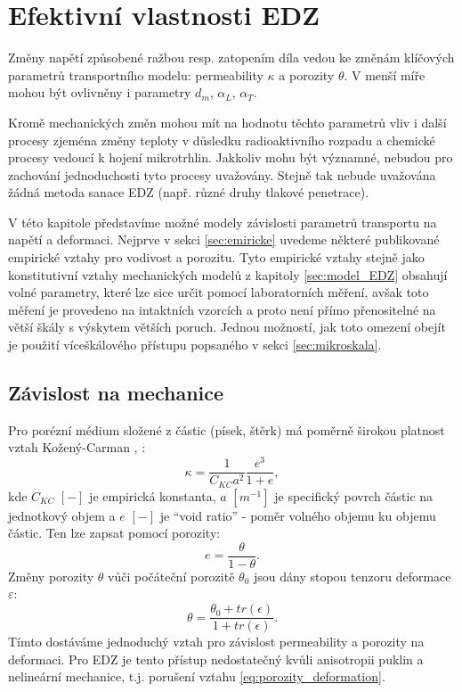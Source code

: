 \documentclass{article}
\def\eps{\varepsilon}
\begin{document}
\section{Efektivní vlastnosti EDZ}
\label{sec:micro_EDZ}
Změny napětí způsobené ražbou resp. zatopením díla vedou ke změnám klíčových parametrů transportního modelu:
permeability $\kappa$ a porozity $\theta$. V menší míře mohou být ovlivněny i parametry $d_m$, $\alpha_L$, $\alpha_T$.

Kromě mechanických změn mohou mít na hodnotu těchto parametrů vliv i další procesy zjeména změny teploty v důsledku radioaktivního rozpadu a 
chemické procesy vedoucí k hojení mikrotrhlin. Jakkoliv mohu být významné, nebudou pro zachování jednoduchosti tyto procesy uvažovány.
Stejně tak nebude uvažována žádná metoda sanace EDZ (např. různé druhy tlakové penetrace).

V této kapitole představíme možné modely závislosti parametrů transportu na napětí a deformaci.
Nejprve v sekci \ref{sec:emiricke} uvedeme některé publikované empirické vztahy pro vodivost a porozitu.
Tyto empirické vztahy stejně jako konstitutivní vztahy mechanických modelů z kapitoly \ref{sec:model_EDZ} 
obsahují volné parametry, které lze sice určit pomocí laboratorních měření, avšak toto měření je provedeno na intaktních vzorcích
a proto není přímo přenositelné na větší škály s výskytem větších poruch. Jednou možností, jak toto omezení obejít je
použití víceškálového přístupu popsaného v sekci  \ref{sec:mikroskala}.


\subsection{Závislost na mechanice}
\label{sec:empiricke}

Pro porézní médium složené z částic (písek, štěrk) má poměrně širokou platnost vztah Kožený-Carman \cite{Carman1956}, \cite{Carrier2003}:
\begin{equation}
  \label{eq:Kozeny}
  \kappa = \frac{1}{C_{KC}a^2}\frac{e^3}{1+e},
\end{equation}
kde $C_{KC}$ $[-]$ je empirická konstanta, $a$  $[m^{-1}]$ je specifický povrch částic na jednotkový objem a $e$ $[-]$ je  ``void ratio'' -
poměr volného objemu ku objemu částic. Ten lze zapsat pomocí porozity:
\[
   e = \frac{\theta}{1 - \theta}.
\]
Změny porozity $\theta$ vůči počáteční porozitě $\theta_0$ jsou dány stopou tenzoru deformace $\eps$:
\begin{equation}
   \label{eq:porozity_deformation}
   \theta = \frac{\theta_0 + tr(\epsilon)}{1 + tr(\epsilon)}.
\end{equation}
Tímto dostáváme jednoduchý vztah pro závislost permeability a porozity na deformaci. Pro EDZ je tento přístup nedostatečný kvůli anisotropii
puklin a nelineární mechanice, t.j.  porušení vztahu \eqref{eq:porozity_deformation}.
\end{document}
